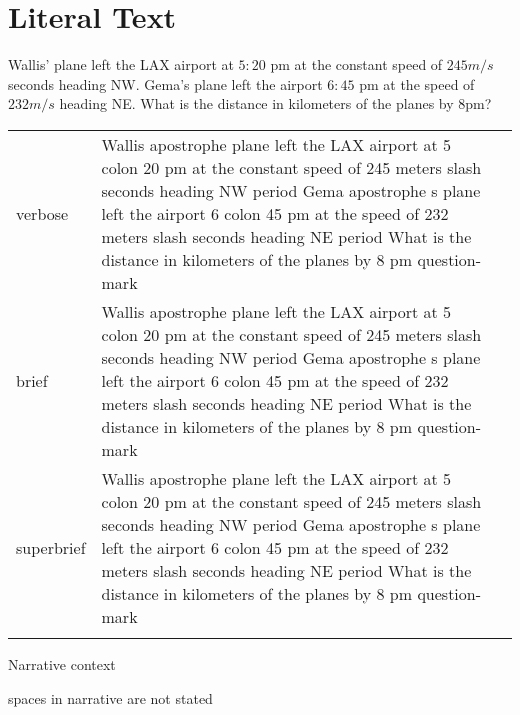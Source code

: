 \section{Literal Text}

\R
\E Wallis' plane left the LAX airport at $5:20$ pm at the constant speed of $245
m/s$ seconds heading NW. Gema's plane left the airport $6:45$ pm
at the speed of $232 m/s$ heading NE. What is the distance
in kilometers of the planes by $8$pm?

\begin{longtable}[c]{@{}lll@{}}
\toprule\addlinespace
verbose & Wallis apostrophe plane left the LAX airport at 5 colon 20 pm
at the constant speed of 245 meters slash seconds heading NW period Gema
apostrophe s plane left the airport 6 colon 45 pm at the speed of 232
meters slash seconds heading NE period What is the distance in
kilometers of the planes by 8 pm question-mark &

\\\addlinespace
brief & Wallis apostrophe plane left the LAX airport at 5 colon 20 pm at
the constant speed of 245 meters slash seconds heading NW period Gema
apostrophe s plane left the airport 6 colon 45 pm at the speed of 232
meters slash seconds heading NE period What is the distance in
kilometers of the planes by 8 pm question-mark &

\\\addlinespace
superbrief & Wallis apostrophe plane left the LAX airport at 5 colon 20
pm at the constant speed of 245 meters slash seconds heading NW period
Gema apostrophe s plane left the airport 6 colon 45 pm at the speed of
232 meters slash seconds heading NE period What is the distance in
kilometers of the planes by 8 pm question-mark &

\\\addlinespace
\bottomrule
\end{longtable}


\R
Narrative context

\R
spaces in narrative are not stated


